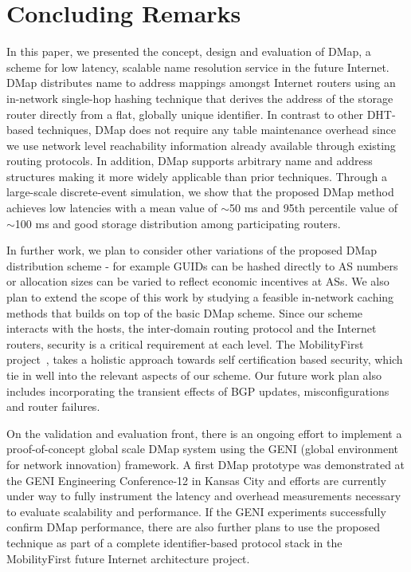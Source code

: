 \section{Concluding Remarks}
\label{sec:conclusion}
In this paper, we presented the concept, design and evaluation of DMap, a scheme for low latency, scalable name resolution service in the future Internet. DMap distributes name to address mappings amongst Internet routers using an in-network single-hop hashing technique that derives the address of the storage router directly from a flat, globally unique identifier. In contrast to other DHT-based techniques, DMap does not require any table maintenance overhead since we use network level reachability information already available through existing routing protocols. In addition, DMap supports arbitrary name and address structures making it more widely applicable than prior techniques. Through a large-scale discrete-event simulation, we show that the proposed DMap method achieves low latencies with a mean value of $\sim$50 ms and 95th percentile value of $\sim$100 ms and good storage distribution among participating routers.

In further work, we plan to consider other variations of the proposed DMap distribution scheme - for example GUIDs can be hashed directly to AS numbers or allocation sizes can be varied to reflect economic incentives at ASs. We also plan to extend the scope of this work by studying a feasible in-network caching methods that builds on top of the basic DMap scheme. Since our scheme interacts with the hosts, the inter-domain routing protocol and the Internet routers, security is a critical requirement at each level. The MobilityFirst project~\cite{mobilityFirst}, takes a holistic approach towards self certification based security, which tie in well into the relevant aspects of our scheme. Our future work plan also includes incorporating the transient effects of BGP updates, misconfigurations and router failures.

On the validation and evaluation front, there is an ongoing effort to implement a proof-of-concept global scale DMap system using the GENI (global environment for network innovation) framework.  A first DMap prototype was demonstrated at the GENI Engineering Conference-12 in Kansas City and efforts are currently under way to fully instrument the latency and overhead measurements necessary to evaluate scalability and performance.  If the GENI experiments successfully confirm DMap performance, there are also further plans to use the proposed technique as part of a complete identifier-based protocol stack in the MobilityFirst future Internet architecture project.


 